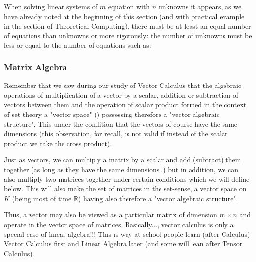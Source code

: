 	When solving linear systems of $m$ equation with $n$ unknowns it appears, as we have already noted at the beginning of this section (and with practical example in the section of Theoretical Computing), there must be at least an equal number of equations than unknowns or more rigorously: the number of unknowns must be less or equal to the number of equations such as:
	
	
	\pagebreak
	\subsubsection{Matrix Algebra}
	Remember that we saw during our study of Vector Calculus that the algebraic operations of multiplication of a vector by a scalar, addition or subtraction of vectors between them and the operation of scalar product formed in the context of set theory a "vector space" () possessing therefore a "vector algebraic structure". This under the condition that the vectors of course have the same dimensions (this observation, for recall, is not valid if instead of the scalar product we take the cross product).
	
	Just as vectors, we can multiply a matrix by a scalar and add (subtract) them together (as long as they have the same dimensions..) but in addition, we can also multiply two matrices together under certain conditions which we will define below. This will also make the set of matrices in the set-sense, a vector space on $K$ (being most of time $\mathbb{R}$) having also therefore a "vector algebraic structure".
	
	Thus, a vector may also be viewed as a particular matrix of dimension $m\times n$  and operate in the vector space of matrices. Basically..., vector calculus is only a special case of linear algebra!!! This is way at school people learn (after Calculus) Vector Calculus first and Linear Algebra later (and some will lean after Tensor Calculus).
	
